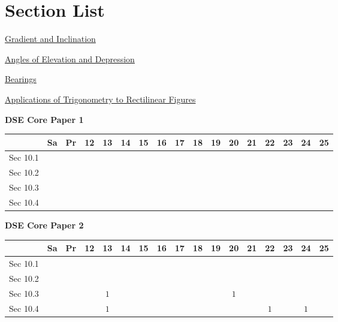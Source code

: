 \documentclass[12pt, a4paper]{article}
\begin{document}
\section*{Section List}
\begin{enumx}[label=Sec 10.\arabic*\ ]
\item \hyperref[section:3-10-1]{Gradient and Inclination}
\item \hyperref[section:3-10-2]{Angles of Elevation and Depression}
\item \hyperref[section:3-10-3]{Bearings}
\item \hyperref[section:3-10-4]{Applications of Trigonometry to Rectilinear Figures}
\end{enumx}
\begin{absolutelynopagebreak}
\begin{center}
\textbf{DSE Core Paper 1}
\end{center}
\begin{center}
\begin{tabular}{|l|c|c|c|c|c|c|c|c|c|c|c|c|c|c|c|c|}
\hline
        & Sa & Pr & 12 & 13 & 14 & 15 & 16 & 17 & 18 & 19 & 20 & 21 & 22 & 23 & 24 & 25 \\\hline\hline
Sec 10.1 &  &  &  &  &  &  &  &  &  &  &  &  &  &  &  &  \\\hline
Sec 10.2 &  &  &  &  &  &  &  &  &  &  &  &  &  &  &  &  \\\hline
Sec 10.3 &  &  &  &  &  &  &  &  &  &  &  &  &  &  &  &  \\\hline
Sec 10.4 &  &  &  &  &  &  &  &  &  &  &  &  &  &  &  &  \\\hline
\end{tabular}
\end{center}
\end{absolutelynopagebreak}
\begin{absolutelynopagebreak}
\begin{center}
\textbf{DSE Core Paper 2}
\end{center}
\begin{center}
\begin{tabular}{|l|c|c|c|c|c|c|c|c|c|c|c|c|c|c|c|c|}
\hline
        & Sa & Pr & 12 & 13 & 14 & 15 & 16 & 17 & 18 & 19 & 20 & 21 & 22 & 23 & 24 & 25 \\\hline\hline
Sec 10.1 &  &  &  &  &  &  &  &  &  &  &  &  &  &  &  &  \\\hline
Sec 10.2 &  &  &  &  &  &  &  &  &  &  &  &  &  &  &  &  \\\hline
Sec 10.3 &  &  &  &  $1$ &  &  &  &  &  &  &  $1$ &  &  &  &  &  \\\hline
Sec 10.4 &  &  &  &  $1$ &  &  &  &  &  &  &  &  &  $1$ &  &  $1$ &  \\\hline
\end{tabular}
\end{center}
\end{absolutelynopagebreak}
\end{document}
